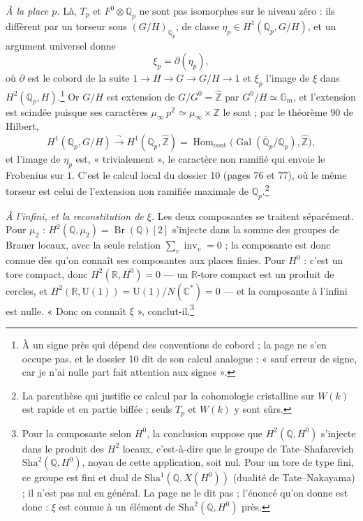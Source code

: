\documentclass[11pt,a4paper]{article}
\begin{document}
\emph{À la place $p$.} Là, $T_{p}$ et $F^{0} \otimes \mathbb{Q}_{p}$ ne sont
pas isomorphes sur le niveau zéro : ils diffèrent par un torseur sous
$(G/H)_{\mathbb{Q}_{p}}$, de classe $\eta_{p} \in H^{1}(\mathbb{Q}_{p}, G/H)$,
et un argument universel donne
\[
  \xi_{p} = \partial(\eta_{p}) ,
\]
où $\partial$ est le cobord de la suite $1 \to H \to G \to G/H \to 1$ et $\xi_{p}$
l'image de $\xi$ dans $H^{2}(\mathbb{Q}_{p}, H)$.\footnote{À un signe près qui
dépend des conventions de cobord ; la page ne s'en occupe pas, et le dossier
10 dit de son calcul analogue : « sauf erreur de signe, car je n'ai nulle part
fait attention aux signes ».} Or $G/H$ est extension de $G/G^{0} =
\widehat{\mathbb{Z}}$ par $G^{0}/H \simeq \mathbb{G}_{m}$, et l'extension est
scindée puisque ses caractères $\mu_{\infty}\, p^{\mathbb{Z}} \simeq
\mu_{\infty} \times \mathbb{Z}$ le sont ; par le théorème 90 de Hilbert,
\[
  H^{1}(\mathbb{Q}_{p}, G/H) \xrightarrow{\ \sim\ } H^{1}(\mathbb{Q}_{p},
  \widehat{\mathbb{Z}}) = \operatorname{Hom}_{\mathrm{cont}}\bigl(
  \operatorname{Gal}(\overline{\mathbb{Q}}_{p}/\mathbb{Q}_{p}),
  \widehat{\mathbb{Z}} \bigr) ,
\]
et l'image de $\eta_{p}$ est, « trivialement », le caractère non ramifié qui
envoie le Frobenius sur $1$. C'est le calcul local du dossier 10 (pages 76 et
77), où le même torseur est celui de l'extension non ramifiée maximale de
$\mathbb{Q}_{p}$.\footnote{La parenthèse qui justifie ce calcul par la
cohomologie cristalline sur $W(k)$ est rapide et en partie biffée ; seuls
$T_{p}$ et $W(k)$ y sont sûrs.}

\emph{À l'infini, et la reconstitution de $\xi$.} Les deux composantes se
traitent séparément. Pour $\mu_{2}$ : $H^{2}(\mathbb{Q}, \mu_{2}) =
\operatorname{Br}(\mathbb{Q})[2]$ s'injecte dans la somme des groupes de Brauer
locaux, avec la seule relation $\sum_{v} \operatorname{inv}_{v} = 0$ ; la
composante est donc connue dès qu'on connaît ses composantes aux places finies.
Pour $H^{0}$ : c'est un tore compact, donc $H^{2}(\mathbb{R}, H^{0}) = 0$ ---
un $\mathbb{R}$-tore compact est un produit de cercles, et
$H^{2}(\mathbb{R}, \mathrm{U}(1)) = \mathrm{U}(1)/N(\mathbb{C}^{*}) = 0$ --- et
la composante à l'infini est nulle. « Donc on connaît $\xi$ »,
conclut-il.\footnote{Pour la composante selon $H^{0}$, la conclusion suppose
que $H^{2}(\mathbb{Q}, H^{0})$ s'injecte dans le produit des $H^{2}$ locaux,
c'est-à-dire que le groupe de Tate--Shafarevich
$\mathrm{Sha}^{2}(\mathbb{Q}, H^{0})$, noyau de cette application, soit nul. Pour un tore de type fini, ce groupe
est fini et dual de $\mathrm{Sha}^{1}(\mathbb{Q}, X(H^{0}))$ (dualité de
Tate--Nakayama) ; il n'est pas nul en général. La page ne le dit pas ;
l'énoncé qu'on donne est donc : $\xi$ est connue à un élément de
$\mathrm{Sha}^{2}(\mathbb{Q}, H^{0})$ près.}
\end{document}
